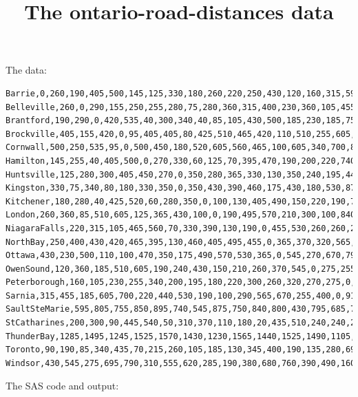 \documentclass{article}
\title{The ontario-road-distances data}
\begin{document}
\maketitle
The data:
\begin{verbatim}
Barrie,0,260,190,405,500,145,125,330,180,260,220,250,430,120,160,315,595,200,1285,90,430
Belleville,260,0,290,155,250,255,280,75,280,360,315,400,230,360,105,455,805,300,1495,190,545
Brantford,190,290,0,420,535,40,300,340,40,85,105,430,500,185,230,185,755,90,1245,85,275
Brockville,405,155,420,0,95,405,405,80,425,510,465,420,110,510,255,605,850,445,1525,340,695
Cornwall,500,250,535,95,0,500,450,180,520,605,560,465,100,605,340,700,895,540,1570,435,790
Hamilton,145,255,40,405,500,0,270,330,60,125,70,395,470,190,200,220,740,50,1430,70,310
Huntsville,125,280,300,405,450,270,0,350,280,365,330,130,350,240,195,440,545,310,1230,215,555
Kingston,330,75,340,80,180,330,350,0,350,430,390,460,175,430,180,530,875,370,1565,260,620
Kitchener,180,280,40,425,520,60,280,350,0,100,130,405,490,150,220,190,750,110,1440,105,285
London,260,360,85,510,605,125,365,430,100,0,190,495,570,210,300,100,840,180,1525,185,190
NiagaraFalls,220,315,105,465,560,70,330,390,130,190,0,455,530,260,260,290,800,20,1490,130,380
NorthBay,250,400,430,420,465,395,130,460,405,495,455,0,365,370,320,565,430,435,1105,345,680
Ottawa,430,230,500,110,100,470,350,175,490,570,530,365,0,545,270,670,795,510,1465,400,760
OwenSound,120,360,185,510,605,190,240,430,150,210,260,370,545,0,275,255,685,240,1375,190,390
Peterborough,160,105,230,255,340,200,195,180,220,300,260,320,270,275,0,400,700,240,1390,135,490
Sarnia,315,455,185,605,700,220,440,530,190,100,290,565,670,255,400,0,910,275,1600,280,160
SaultSteMarie,595,805,755,850,895,740,545,875,750,840,800,430,795,685,700,910,0,780,690,690,1025
StCatharines,200,300,90,445,540,50,310,370,110,180,20,435,510,240,240,275,780,0,1470,110,365
ThunderBay,1285,1495,1245,1525,1570,1430,1230,1565,1440,1525,1490,1105,1465,1375,1390,1600,690,1470,0,1375,1715
Toronto,90,190,85,340,435,70,215,260,105,185,130,345,400,190,135,280,690,110,1375,0,370
Windsor,430,545,275,695,790,310,555,620,285,190,380,680,760,390,490,160,1025,365,1715,370,0
\end{verbatim}
The SAS code and output:
\end{document}
